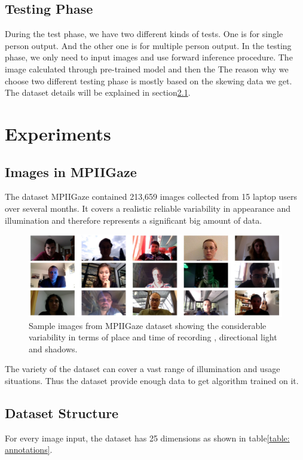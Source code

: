 \documentclass[senior]{IPSstyle}
\begin{document}
\section{Testing Phase} \label{testing phase}
During the test phase, we have two different kinds of tests.
One is for single person output.
And the other one is for multiple person output.
In the testing phase, we only need to input images and use forward inference procedure.
The image calculated through pre-trained model and then the 
The reason why we choose two different testing phase is mostly based on the skewing data we get.
The dataset details will be explained in section\ref{sec: dataset}.


\chapter{Experiments} \label{experiments}
\section{Images in MPIIGaze}\label{sec: dataset}
The dataset MPIIGaze contained 213,659 images collected from 15 laptop users over several months.
It covers a realistic reliable variability in appearance and illumination and therefore represents a significant big amount of data.
\begin{figure}
    \centering
    \includegraphics[width=15cm]{MasterThesis-master/images/head_images.jpg}
    \caption{Sample images from MPIIGaze dataset showing the considerable variability in terms of place and time of recording , directional light and shadows.}
    \label{fig:head images}
\end{figure}
The variety of the dataset can cover a vast range of illumination and usage situations.
Thus the dataset provide enough data to get algorithm trained on it.

\section{Dataset Structure}
For every image input, the dataset has 25 dimensions as shown in table\ref{table: annotations}.
\end{document}
